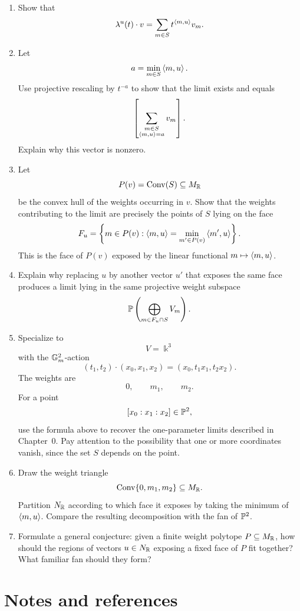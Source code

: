 \begin{enumerate}[label=\textbf{Hint \arabic*.},wide=0pt]

\item Show that
\[
\lambda^{u}(t)\cdot v
=
\sum_{m\in S}t^{\left\langle m,u\right\rangle}v_m.
\]

\item Let
\[
a=\min_{m\in S}\left\langle m,u\right\rangle.
\]
Use projective rescaling by \(t^{-a}\) to show that the limit exists
and equals
\[
\left[
\sum_{\substack{m\in S\\
\left\langle m,u\right\rangle=a}}
v_m
\right].
\]
Explain why this vector is nonzero.

\item Let
\[
P(v)=\operatorname{Conv}(S)\subseteq M_{\mathbb{R}}
\]
be the convex hull of the weights occurring in \(v\). Show that the
weights contributing to the limit are precisely the points of \(S\)
lying on the face
\[
F_u
=
\left\{
m\in P(v):
\left\langle m,u\right\rangle
=
\min_{m'\in P(v)}\left\langle m',u\right\rangle
\right\}.
\]
This is the face of \(P(v)\) exposed by the linear functional
\(m\mapsto\left\langle m,u\right\rangle\).

\item Explain why replacing \(u\) by another vector \(u'\) that exposes
the same face produces a limit lying in the same projective weight
subspace
\[
\mathbb{P}\left(\bigoplus_{m\in F_u\cap S}V_m\right).
\]

\item Specialize to
\[
V=\Bbbk^3
\]
with the \(\mathbb{G}_{m}^2\)-action
\[
(t_1,t_2)\cdot(x_0,x_1,x_2)
=
(x_0,t_1x_1,t_2x_2).
\]
The weights are
\[
0,\qquad m_1,\qquad m_2.
\]
For a point
\[
[x_0:x_1:x_2]\in\mathbb{P}^2,
\]
use the formula above to recover the one-parameter limits described in
Chapter~0. Pay attention to the possibility that one or more
coordinates vanish, since the set \(S\) depends on the point.

\item Draw the weight triangle
\[
\operatorname{Conv}\{0,m_1,m_2\}\subseteq M_{\mathbb{R}}.
\]
Partition \(N_{\mathbb{R}}\) according to which face it exposes by taking the
minimum of \(\left\langle m,u\right\rangle\). Compare the resulting decomposition
with the fan of \(\mathbb{P}^2\).

\item Formulate a general conjecture: given a finite weight polytope
\(P\subseteq M_{\mathbb{R}}\), how should the regions of vectors
\(u\in N_{\mathbb{R}}\) exposing a fixed face of \(P\) fit together? What
familiar fan should they form?

\end{enumerate}

\clearpage
\section*{Notes and references}

